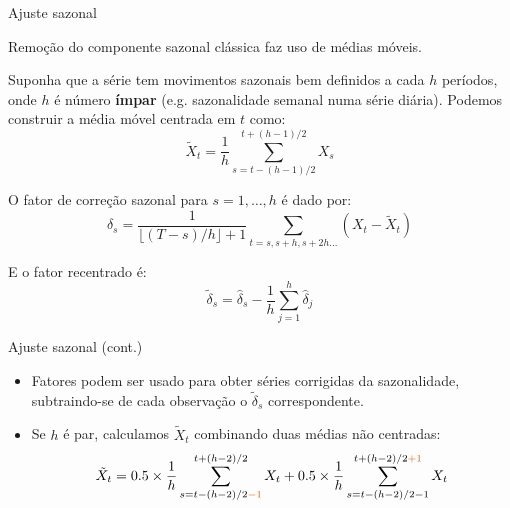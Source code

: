 \documentclass[11pt]{beamer}
\newenvironment{halfwideitemize}{\itemize\addtolength{\itemsep}{0.5em}}{\enditemize}
\begin{document}
\begin{frame}{Ajuste sazonal}
	\begin{halfwideitemize}
		\item Remoção do componente sazonal clássica faz uso de {\color{blue}médias móveis}.
		\item Suponha que a série tem movimentos sazonais bem definidos a cada $h$ períodos, onde $h$ é número \textbf{ímpar} (e.g. sazonalidade semanal numa série diária). Podemos construir a {\color{blue} média móvel centrada em $t$} como:
		\begin{equation}
			\tilde{X}_t = \frac{1}{h}\sum_{s = t - (h-1)/2}^{t+(h-1)/2} X_s
		\end{equation}
		\item O {\color{blue}fator de correção sazonal} para $s=1,\ldots, h$ é dado por:
		\begin{equation}
			\hat{\delta}_s = \frac{1}{\lfloor (T - s)/h\rfloor + 1}\sum_{t = s, s + h, s+ 2h \ldots} (X_t - \tilde{X}_t)
		\end{equation}
		\item E o fator recentrado é:
		\begin{equation}
			\tilde{\delta}_s = \hat{\delta}_s - \frac{1}{h}\sum_{j=1}^h \hat{\delta}_j		
		\end{equation}

		
	\end{halfwideitemize}
	
\end{frame}

\begin{frame}{Ajuste sazonal (cont.)}
	\begin{itemize}
				\item Fatores podem ser usado para obter séries corrigidas da sazonalidade, subtraindo-se de cada observação  o $\tilde{\delta}_s$ correspondente.
		\item Se $h$ é par, calculamos $\tilde{X}_t$ combinando duas médias não centradas:
		$$			\tilde{X}_t =0.5 \times \frac{1}{h}\sum_{s = t - (h-2)/2 {\color{red}- 1}}^{t+(h-2)/2} X_t + 0.5 \times \frac{1}{h}\sum_{s = t - (h-2)/2 - 1}^{t+(h-2)/2{\color{red}+1}} X_t $$
	\end{itemize}
\end{frame}
\end{document}
